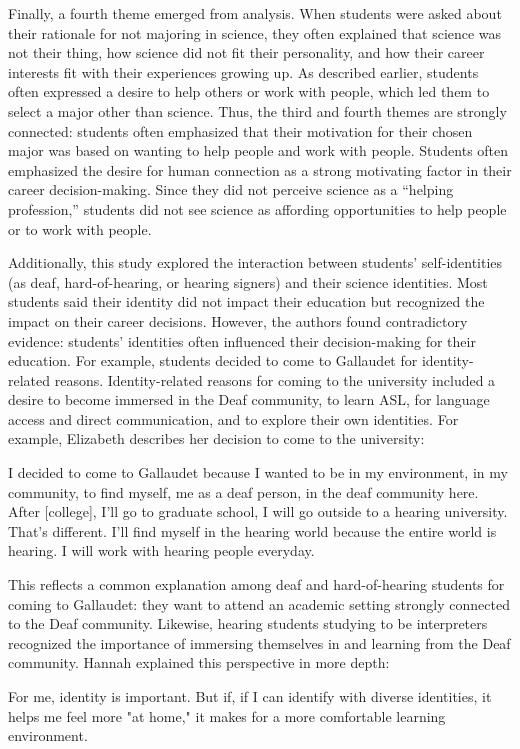 \documentclass[11.5pt]{sig-alternate} %
\begin{document}
\begin{large}
Finally, a fourth theme emerged from analysis. When students were asked about their rationale for not majoring in science, they often explained that science was not their thing, how science did not fit their personality, and how their career interests fit with their experiences growing up. As described earlier, students often expressed a desire to help others or work with people, which led them to select a major other than science. Thus, the third and fourth themes are strongly connected: students often emphasized that their motivation for their chosen major was based on wanting to help people and work with people. Students often emphasized the desire for human connection as a strong motivating factor in their career decision-making. Since they did not perceive science as a “helping profession,” students did not see science as affording opportunities to help people or to work with people. 

Additionally, this study explored the interaction between students’ self-identities (as deaf, hard-of-hearing, or hearing signers) and their science identities. Most students said their identity did not impact their education but recognized the impact on their career decisions. However, the authors found contradictory evidence: students’ identities often influenced their decision-making for their education. For example, students decided to come to Gallaudet for identity-related reasons. Identity-related reasons for coming to the university included a desire to become immersed in the Deaf community, to learn ASL, for language access and direct communication, and to explore their own identities. For example, Elizabeth describes her decision to come to the university: 

I decided to come to Gallaudet because I wanted to be in my environment, in my community, to find myself, me as a deaf person, in the deaf community here. After [college], I'll go to graduate school, I will go outside to a hearing university. That's different. I'll find myself in the hearing world because the entire world is hearing. I will work with hearing people everyday.

This reflects a common explanation among deaf and hard-of-hearing students for coming to Gallaudet: they want to attend an academic setting strongly connected to the Deaf community. Likewise, hearing students studying to be interpreters recognized the importance of immersing themselves in and learning from the Deaf community. Hannah explained this perspective in more depth:

For me, identity is important. But if, if I can identify with diverse identities, it helps me feel more "at home," it makes for a more comfortable learning environment.


\end{large}
\end{document}
